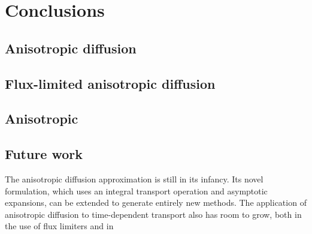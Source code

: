 
\chapter{Conclusions}\label{chap:conclusion}



\section{Anisotropic diffusion}

\section{Flux-limited anisotropic diffusion}

\section{Anisotropic \texorpdfstring{\Pone}{P1}}

\section{Future work}

The anisotropic diffusion approximation is still in its infancy. Its novel
formulation, which uses an integral transport operation and asymptotic
expansions, can be extended to generate entirely new methods. The application
of anisotropic diffusion to time-dependent transport also has room to grow,
both in the use of flux limiters and in 


